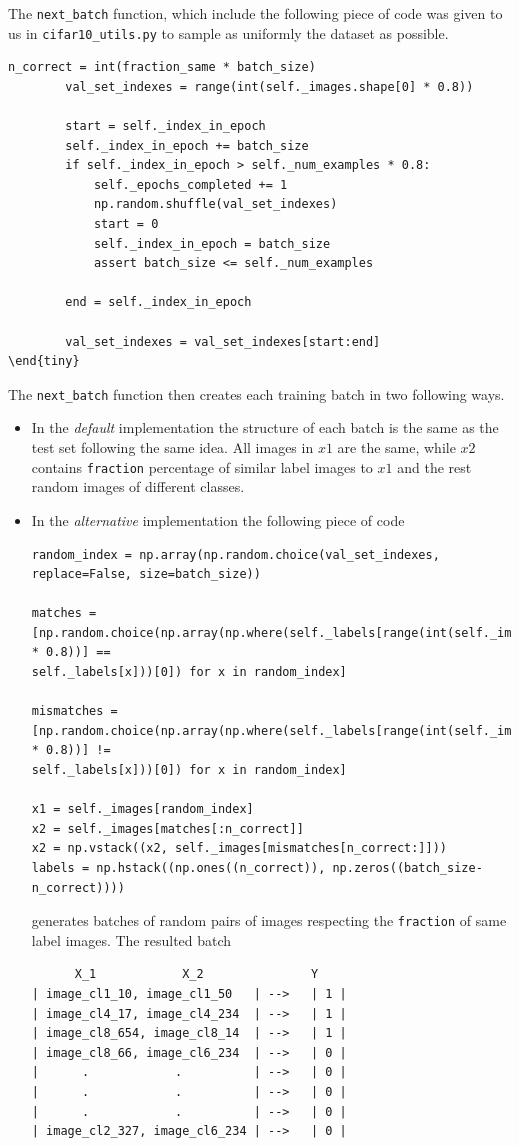 \documentclass{article}
\begin{document}
The \texttt{next\_batch} function, which include the following piece of code was given to us in \texttt{cifar10\_utils.py} to sample as uniformly the dataset as possible.
\begin{tiny}
\begin{verbatim}
n_correct = int(fraction_same * batch_size)
        val_set_indexes = range(int(self._images.shape[0] * 0.8))

        start = self._index_in_epoch
        self._index_in_epoch += batch_size
        if self._index_in_epoch > self._num_examples * 0.8:
            self._epochs_completed += 1
            np.random.shuffle(val_set_indexes)
            start = 0
            self._index_in_epoch = batch_size
            assert batch_size <= self._num_examples

        end = self._index_in_epoch

        val_set_indexes = val_set_indexes[start:end]
\end{tiny}
\end{verbatim}
\end{tiny}
The \texttt{next\_batch} function then creates each training batch in two following ways.
\begin{itemize}
\item In the \emph{default} implementation the structure of each batch is the same as the test set following the same idea.
All images in $x1$ are the same, while $x2$ contains \texttt{fraction} percentage of similar label images to $x1$ and the rest random images of different classes.
\item In the \emph{alternative} implementation the following piece of code
\begin{tiny}
\begin{verbatim}
random_index = np.array(np.random.choice(val_set_indexes, replace=False, size=batch_size))

matches = [np.random.choice(np.array(np.where(self._labels[range(int(self._images.shape[0] * 0.8))] == 
self._labels[x]))[0]) for x in random_index]

mismatches = [np.random.choice(np.array(np.where(self._labels[range(int(self._images.shape[0] * 0.8))] != 
self._labels[x]))[0]) for x in random_index]

x1 = self._images[random_index]
x2 = self._images[matches[:n_correct]]
x2 = np.vstack((x2, self._images[mismatches[n_correct:]]))
labels = np.hstack((np.ones((n_correct)), np.zeros((batch_size-n_correct))))
\end{verbatim}
\end{tiny}
generates batches of random pairs of images respecting the \texttt{fraction} of same label images.
The resulted batch 
\begin{verbatim}
      X_1            X_2               Y
| image_cl1_10, image_cl1_50   | -->   | 1 |
| image_cl4_17, image_cl4_234  | -->   | 1 |
| image_cl8_654, image_cl8_14  | -->   | 1 |
| image_cl8_66, image_cl6_234  | -->   | 0 |
|      .            .          | -->   | 0 |
|      .            .          | -->   | 0 |
|      .            .          | -->   | 0 |
| image_cl2_327, image_cl6_234 | -->   | 0 |
\end{verbatim}
\end{itemize}
\end{document}
